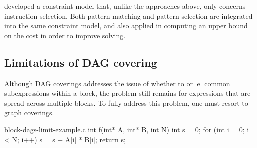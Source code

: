 \textcite{Beg:2013} developed a \gls{constraint model} that, unlike the
approaches above, only concerns \gls{instruction selection}.
%
Both \gls{pattern matching} and \gls{pattern selection} are integrated into the
same \gls{constraint model}, and \citeauthor{Beg:2013} also applied
 in computing an upper bound on the cost
in order to improve solving.


\subsection{Limitations of DAG covering}

Although \glspl{DAG covering} addresses the issue of whether to  or [e] common subexpressions within a
\gls{block}, the problem still remains for expressions that are spread across
multiple \glspl{block}.
%
To fully address this problem, one must resort to \glspl{graph covering}.

\begin{filecontents*}{block-dags-limit-example.c}
int f(int* A, int* B, int N) {
  int s = 0;
  for (int i = 0; i < N; i++) {
    s = s + A[i] * B[i];
  }
  return s;
}
\end{filecontents*}

